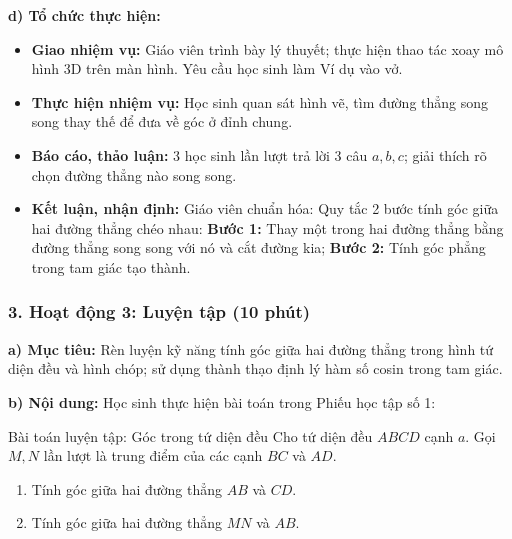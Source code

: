 \documentclass[12pt, a4paper]{article}
\begin{document}
\noindent \textbf{d) Tổ chức thực hiện:}
\begin{itemize}[leftmargin=0.6cm]
    \item \textbf{Giao nhiệm vụ:} Giáo viên trình bày lý thuyết; thực hiện thao tác xoay mô hình 3D trên màn hình. Yêu cầu học sinh làm Ví dụ vào vở.
    \item \textbf{Thực hiện nhiệm vụ:} Học sinh quan sát hình vẽ, tìm đường thẳng song song thay thế để đưa về góc ở đỉnh chung.
    \item \textbf{Báo cáo, thảo luận:} 3 học sinh lần lượt trả lời 3 câu $a, b, c$; giải thích rõ chọn đường thẳng nào song song.
    \item \textbf{Kết luận, nhận định:} Giáo viên chuẩn hóa: Quy tắc 2 bước tính góc giữa hai đường thẳng chéo nhau: \textbf{Bước 1:} Thay một trong hai đường thẳng bằng đường thẳng song song với nó và cắt đường kia; \textbf{Bước 2:} Tính góc phẳng trong tam giác tạo thành.
\end{itemize}

\subsubsection*{3. Hoạt động 3: Luyện tập (10 phút)}

\noindent \textbf{a) Mục tiêu:}
Rèn luyện kỹ năng tính góc giữa hai đường thẳng trong hình tứ diện đều và hình chóp; sử dụng thành thạo định lý hàm số cosin trong tam giác.

\noindent \textbf{b) Nội dung:}
Học sinh thực hiện bài toán trong Phiếu học tập số 1:
\begin{pedabox}{Bài toán luyện tập: Góc trong tứ diện đều}
Cho tứ diện đều $ABCD$ cạnh $a$. Gọi $M, N$ lần lượt là trung điểm của các cạnh $BC$ và $AD$.
\begin{enumerate}[leftmargin=0.6cm]
    \item Tính góc giữa hai đường thẳng $AB$ và $CD$.
    \item Tính góc giữa hai đường thẳng $MN$ và $AB$.
\end{enumerate}
\end{pedabox}
\end{document}

